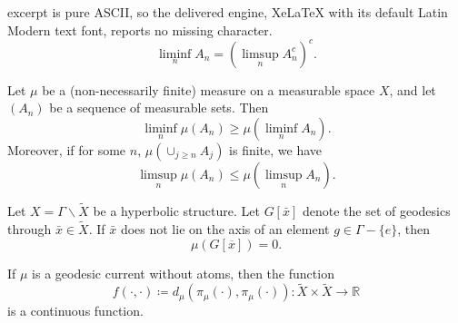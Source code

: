 \documentclass[10pt,a4paper]{amsart}
\newcommand*{\wt}[1]{\widetilde{#1}}
\begin{document}
excerpt is pure ASCII, so the delivered engine, XeLaTeX with its default Latin Modern text font, reports no missing character.
\begin{equation}
\liminf_n A_n = \left( \limsup_n A_n^c \right)^c.
\label{eq:complements}
\end{equation}

\begin{lemma}
Let $\mu$ be a (non-necessarily finite) measure on a measurable space $X$, and let $(A_n)$ be a sequence of measurable sets.
Then
\[
\liminf_n \mu(A_n) \geq \mu(\liminf_n A_n).
\]
Moreover, if for some $n$, $\mu \left( \cup_{j \geq n} A_j \right)$ is finite, we have
\[
\limsup_n \mu(A_n) \leq \mu(\limsup_n A_n).
\]
\label{lem:fatou}
\end{lemma}

\begin{proposition}
Let $X=\Gamma \backslash \wt{X}$ be a hyperbolic structure. Let $G[\bar{x}]$ denote the set of geodesics through $\bar{x} \in \wt{X}$.
If $\bar{x}$ does not lie on the axis of an element $g \in \Gamma - \{ e\}$, then
\[
\mu(G[\overline{x}])=0.
\]
\label{prop:zeromeasure}
\end{proposition}

\begin{proposition}
If $\mu$ is a geodesic current without atoms, then the function
\[f(\cdot, \cdot) \coloneqq d_{\mu}(\pi_{\mu}(\cdot ), \pi_{\mu}(\cdot)) \colon \wt{X} \times \wt{X} \to \mathbb{R}\] is a continuous function.
\label{prop:contdistance}
\end{proposition}
\end{document}
